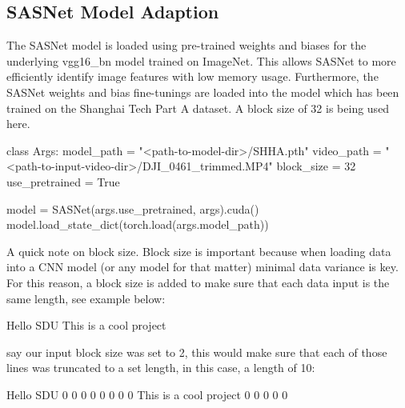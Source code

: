 \documentclass[
]{article}
\newenvironment{Shaded}{\begin{snugshade}}{\end{snugshade}}
\newcommand{\DecValTok}[1]{\textcolor[rgb]{0.68,0.00,0.00}{#1}}
\newcommand{\KeywordTok}[1]{\textcolor[rgb]{0.00,0.23,0.31}{#1}}
\newcommand{\NormalTok}[1]{\textcolor[rgb]{0.00,0.23,0.31}{#1}}
\newcommand{\OperatorTok}[1]{\textcolor[rgb]{0.37,0.37,0.37}{#1}}
\newcommand{\StringTok}[1]{\textcolor[rgb]{0.13,0.47,0.30}{#1}}
\newcommand{\VariableTok}[1]{\textcolor[rgb]{0.07,0.07,0.07}{#1}}
\begin{document}
\hypertarget{sasnet-model-adaption}{%
\subsection{SASNet Model Adaption}\label{sasnet-model-adaption}}

The SASNet model is loaded using pre-trained weights and biases for the
underlying vgg16\_bn model trained on ImageNet. This allows SASNet to
more efficiently identify image features with low memory usage.
Furthermore, the SASNet weights and bias fine-tunings are loaded into
the model which has been trained on the Shanghai Tech Part A dataset. A
block size of 32 is being used here.

\begin{Shaded}
\begin{Highlighting}[]
\KeywordTok{class}\NormalTok{ Args:}
\NormalTok{  model\_path }\OperatorTok{=} \StringTok{"\textless{}path{-}to{-}model{-}dir\textgreater{}/SHHA.pth"}
\NormalTok{  video\_path }\OperatorTok{=} \StringTok{"\textless{}path{-}to{-}input{-}video{-}dir\textgreater{}/DJI\_0461\_trimmed.MP4"}
\NormalTok{  block\_size }\OperatorTok{=} \DecValTok{32}
\NormalTok{  use\_pretrained }\OperatorTok{=} \VariableTok{True}

\NormalTok{model }\OperatorTok{=}\NormalTok{ SASNet(args.use\_pretrained, args).cuda()}
\NormalTok{model.load\_state\_dict(torch.load(args.model\_path))}
\end{Highlighting}
\end{Shaded}

A quick note on block size. Block size is important because when loading
data into a CNN model (or any model for that matter) minimal data
variance is key. For this reason, a block size is added to make sure
that each data input is the same length, see example below:

\begin{Shaded}
\begin{Highlighting}[]
\NormalTok{Hello SDU}
\NormalTok{This }\KeywordTok{is}\NormalTok{ a cool project}
\end{Highlighting}
\end{Shaded}

say our input block size was set to 2, this would make sure that each of
those lines was truncated to a set length, in this case, a length of 10:

\begin{Shaded}
\begin{Highlighting}[]
\NormalTok{Hello SDU }\DecValTok{0} \DecValTok{0}     \DecValTok{0}       \DecValTok{0} \DecValTok{0} \DecValTok{0} \DecValTok{0} \DecValTok{0} 
\NormalTok{This  }\KeywordTok{is}\NormalTok{  a cool  project }\DecValTok{0} \DecValTok{0} \DecValTok{0} \DecValTok{0} \DecValTok{0}
\end{Highlighting}
\end{Shaded}
\end{document}
